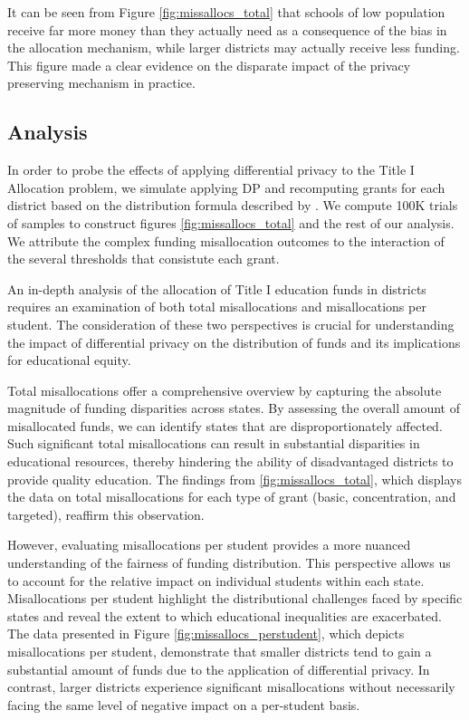 \documentclass[9pt,lineno,twocolumn,twoside]{pnas-new}
\begin{document}
    It can be seen from Figure \ref{fig:missallocs_total} that schools of low population receive far more money than they actually need as a consequence of the bias in the allocation mechanism, while larger districts may actually receive less funding. This figure made a clear evidence on the disparate impact of the privacy preserving mechanism in practice.


    \subsection*{Analysis}
    In order to probe the effects of applying differential privacy to the Title I Allocation problem, we simulate applying DP and recomputing grants for each district based on the distribution formula described by \cite{Sonnenberg:16}. We compute 100K trials of samples to construct figures \ref{fig:missallocs_total} and the rest of our analysis. We attribute the complex funding misallocation outcomes to the interaction of the several thresholds that consistute each grant.

    An in-depth analysis of the allocation of Title I education funds in districts requires an examination of both total misallocations and misallocations per student. The consideration of these two perspectives is crucial for understanding the impact of differential privacy on the distribution of funds and its implications for educational equity.

    Total misallocations offer a comprehensive overview by capturing the absolute magnitude of funding disparities across states. By assessing the overall amount of misallocated funds, we can identify states that are disproportionately affected. Such significant total misallocations can result in substantial disparities in educational resources, thereby hindering the ability of disadvantaged districts to provide quality education. The findings from \ref{fig:missallocs_total}, which displays the data on total misallocations for each type of grant (basic, concentration, and targeted), reaffirm this observation.

    However, evaluating misallocations per student provides a more nuanced understanding of the fairness of funding distribution. This perspective allows us to account for the relative impact on individual students within each state. Misallocations per student highlight the distributional challenges faced by specific states and reveal the extent to which educational inequalities are exacerbated. The data presented in Figure \ref{fig:missallocs_perstudent}, which depicts misallocations per student, demonstrate that smaller districts tend to gain a substantial amount of funds due to the application of differential privacy. In contrast, larger districts experience significant misallocations without necessarily facing the same level of negative impact on a per-student basis.
\end{document}
